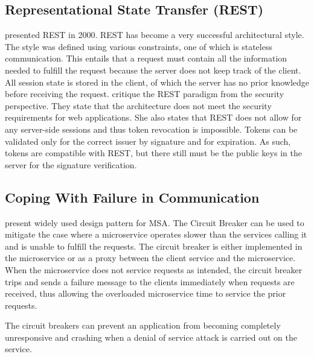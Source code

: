 \subsection{Representational State Transfer (REST)}
\begin{sloppypar}
    \citet{restroy} presented REST in 2000. REST has become a very successful
    architectural style. The style was defined using various constraints, one of
    which is stateless communication. This entails that a request must contain
    all the information needed to fulfill the request because the server does
    not keep track of the client. All session state is stored in the client, of
    which the server has no prior knowledge before receiving the request.
    \citet{secchalmsa} critique the REST paradigm from the security perspective.
    They state that the architecture does not meet the security requirements for
    web applications. She also states that REST does not allow for any
    server-side sessions and thus token revocation is impossible. Tokens can be
    validated only for the correct issuer by signature and for expiration. As
    such, tokens are compatible with REST, but there still must be the public
    keys in the server for the signature verification.
\end{sloppypar}

\subsection{Coping With Failure in Communication}
\begin{sloppypar}
    \citet{DBLP:journals/corr/MontesiW16} present widely used design pattern for
    MSA. The Circuit Breaker can be used to mitigate the case where a
    microservice operates slower than the services calling it and is unable to
    fulfill the requests. The circuit breaker is either implemented in the
    microservice or as a proxy between the client service and the microservice.
    When the microservice does not service requests as intended, the circuit
    breaker trips and sends a failure message to the clients immediately when
    requests are received, thus allowing the overloaded microservice time to
    service the prior requests.
\end{sloppypar}
\begin{sloppypar}
    The circuit breakers can prevent an application from becoming completely
    unresponsive and crashing when a denial of service attack is carried out on
    the service.
\end{sloppypar}

